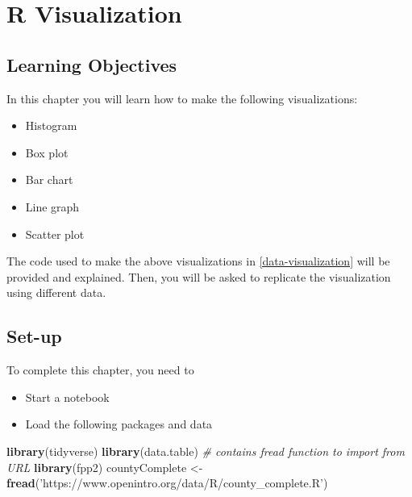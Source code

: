 \documentclass[
]{book}
\newenvironment{Shaded}{\begin{snugshade}}{\end{snugshade}}
\newcommand{\CommentTok}[1]{\textcolor[rgb]{0.56,0.35,0.01}{\textit{#1}}}
\newcommand{\KeywordTok}[1]{\textcolor[rgb]{0.13,0.29,0.53}{\textbf{#1}}}
\newcommand{\NormalTok}[1]{#1}
\newcommand{\StringTok}[1]{\textcolor[rgb]{0.31,0.60,0.02}{#1}}
\providecommand{\tightlist}{%
  \setlength{\itemsep}{0pt}\setlength{\parskip}{0pt}}
\begin{document}
\hypertarget{r-visualization}{%
\chapter{R Visualization}\label{r-visualization}}

\hypertarget{learning-objectives}{%
\section{Learning Objectives}\label{learning-objectives}}

In this chapter you will learn how to make the following visualizations:

\begin{itemize}
\tightlist
\item
  Histogram
\item
  Box plot
\item
  Bar chart
\item
  Line graph
\item
  Scatter plot
\end{itemize}

The code used to make the above visualizations in \ref{data-visualization} will be provided and explained. Then, you will be asked to replicate the visualization using different data.

\hypertarget{set-up}{%
\section{Set-up}\label{set-up}}

To complete this chapter, you need to

\begin{itemize}
\tightlist
\item
  Start a notebook
\item
  Load the following packages and data
\end{itemize}

\begin{Shaded}
\begin{Highlighting}[]
\KeywordTok{library}\NormalTok{(tidyverse)}
\KeywordTok{library}\NormalTok{(data.table) }\CommentTok{# contains fread function to import from URL}
\KeywordTok{library}\NormalTok{(fpp2)}
\NormalTok{countyComplete <-}\StringTok{ }\KeywordTok{fread}\NormalTok{(}\StringTok{'https://www.openintro.org/data/R/county_complete.R'}\NormalTok{)}
\end{Highlighting}
\end{Shaded}
\end{document}
